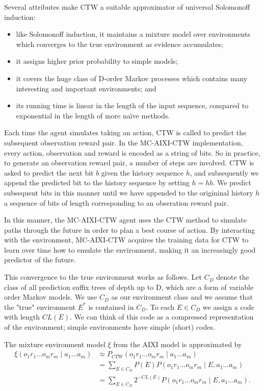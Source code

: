 \documentclass{article}
\theoremstyle{definition}
\newtheorem{primary statistics}[definition]{Primary Statistics}
\newtheorem{auxiliary statistics}[definition]{Auxiliary Statistics}
\begin{document}
Several attributes make CTW a suitable approximator of universal Solomonoff induction:
\begin{itemize}
\item like Solomonoff induction, it maintains a mixture model over environments which converges to the true environment as evidence accumulates;
\item it assigns higher prior probability to simple models;
\item it covers the huge class of D-order Markov processes which contains many interesting and important environments; and
\item its running time is linear in the length of the input sequence, compared to exponential in the length of more na\"ive methods.
\end{itemize}

Each time the agent simulates taking an action, CTW is called to predict the subsequent observation reward pair. In the MC-AIXI-CTW implementation, every action, observation and reward is encoded as a string of bits. So in practice, to generate an observation reward pair, a number of steps are involved. CTW is asked to predict the next bit $b$ given the history sequence $h$, and subsequently we append the predicted bit to the history sequence by setting $h = hb$. We predict subsequent bits in this manner until we have appended to the origininal history $h$ a sequence of bits of length corresponding to an obseration reward pair. 
 
In this manner, the MC-AIXI-CTW agent uses the CTW method to simulate paths through the future in order to plan a best course of action.  By interacting with the environment, MC-AIXI-CTW acquires the training data for CTW to learn over time how to emulate the environment, making it an increasingly good predictor of the future. 

This convergence to the true environment works as follows.
Let $C_D$ denote the class of all prediction suffix trees of depth up to D, which are a form of variable order Markov models. We use $C_D$ as our environment class and we assume that the "true" environment $E^*$ is contained in $C_D$. To each $E \in C_D$ we assign a code with length $CL(E)$. We can think of this code as a compressed representation of the environment; simple environments have simple (short) codes. 

The mixture environment model $\xi$ from the AIXI model is approximated by 
\begin{equation} \label{eq1}
\begin{split}
\xi (o_1r_1 \ldots o_mr_m \mid a_1 \ldots a_m) &\approx  P_{CTW}(o_1r_1 \ldots o_mr_m \mid a_1 \ldots a_m) \\
 & = \sum_{E \in C_D} P(E) P(o_1r_1 \ldots o_mr_m \mid E, a_1 \ldots a_m) \\ 
 & = \sum_{E \in C_D} 2^{-CL(E)} P(o_1r_1 \ldots o_mr_m \mid E, a_1 \ldots a_m).
\end{split}
\end{equation}
\end{document}
